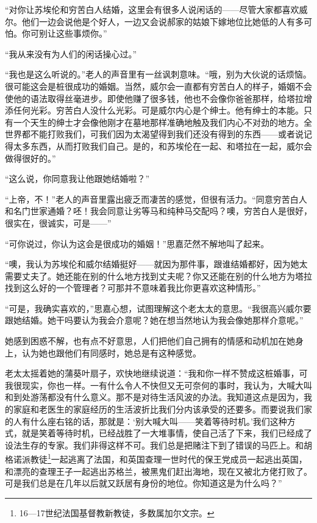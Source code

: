 \par “对你让苏埃伦和穷苦白人结婚，这里会有很多人说闲话的——尽管大家都喜欢威尔。他们一边会说他是个好人，一边又会说郝家的姑娘下嫁地位比她低的人有多可怕。你可别让这些事烦你。”
\par “我从来没有为人们的闲话操心过。”
\par “我也是这么听说的。”老人的声音里有一丝讽刺意味。“哦，别为大伙说的话烦恼。很可能这会是桩很成功的婚姻。当然，威尔会一直都有穷苦白人的样子，婚姻不会使他的语法取得丝毫进步。即使他赚了很多钱，他也不会像你爸爸那样，给塔拉增添任何光彩。穷苦白人没什么光彩。可是威尔内心是个绅士。他有绅士的本能。只有一个天生的绅士才会像他刚才在墓地那样准确地触及我们内心不对劲的地方。全世界都不能打败我们，可我们因为太渴望得到我们还没有得到的东西——或者说记得太多东西，从而打败我们自己。是的，和苏埃伦在一起、和塔拉在一起，威尔会做得很好的。”
\par “这么说，你同意我让他跟她结婚啦？”
\par “上帝，不！”老人的声音里露出疲乏而凄苦的感觉，但很有活力。“同意穷苦白人和名门世家通婚？呸！我会同意让劣等马和纯种马交配吗？噢，穷苦白人是很好，很实在，很诚实，可是——”
\par “可你说过，你认为这会是很成功的婚姻！”思嘉茫然不解地叫了起来。
\par “噢，我认为苏埃伦和威尔结婚挺好——就因为那件事，跟谁结婚都好，因为她太需要丈夫了。她还能在别的什么地方找到丈夫呢？你又还能在别的什么地方为塔拉找到这么好的一个管理者？可那并不意味着我比你更喜欢这种情形。”
\par “可是，我确实喜欢的，”思嘉心想，试图理解这个老太太的意思。“我很高兴威尔要跟她结婚。她干吗要认为我会介意呢？她在想当然地认为我会像她那样介意呢。”
\par 她感到困惑不解，也有点不好意思，人们把他们自己拥有的情感和动机加在她身上，认为她也跟他们有同感时，她总是有这种感觉。
\par 老太太摇着她的蒲葵叶扇子，欢快地继续说道：“我和你一样不赞成这桩婚事，可我很现实，你也一样。一有什么令人不快但又无可奈何的事时，我认为，大喊大叫和到处游荡都没有什么意义。那不是对待生活风波的办法。我知道这点是因为，我的家庭和老医生的家庭经历的生活波折比我们分内该承受的还要多。而要说我们家的人有什么座右铭的话，那就是：‘别大喊大叫——笑着等待时机。’我们这种方式，就是笑着等待时机，已经战胜了一大堆事情，使自己活了下来，我们已经成了设法生存的专家。我们非得这样不可。我们总是把赌注下到了错误的马匹上。和胡格诺派教徒\footnote{16—17世纪法国基督教新教徒，多数属加尔文宗。}一起逃离了法国，和英国查理一世时代的保王党成员一起逃出英国，和漂亮的查理王子一起逃出苏格兰，被黑鬼们赶出海地，现在又被北方佬打败了。可是我们总是在几年以后就又跃居有身份的地位。你知道这是为什么吗？”
